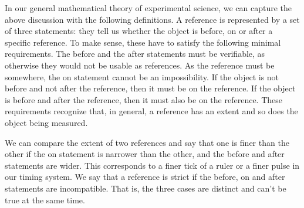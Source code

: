 In our general mathematical theory of experimental science, we can capture the above discussion with the following definitions. A reference is represented by a set of three statements: they tell us whether the object is before, on or after a specific reference. To make sense, these have to satisfy the following minimal requirements. The before and the after statements must be verifiable, as otherwise they would not be usable as references. As the reference must be somewhere, the on statement cannot be an impossibility. If the object is not before and not after the reference, then it must be on the reference. If the object is before and after the reference, then it must also be on the reference. These requirements recognize that, in general, a reference has an extent and so does the object being measured.

We can compare the extent of two references and say that one is finer than the other if the on statement is narrower than the other, and the before and after statements are wider. This corresponds to a finer tick of a ruler or a finer pulse in our timing system. We say that a reference is strict if the before, on and after statements are incompatible. That is, the three cases are distinct and can't be true at the same time.

